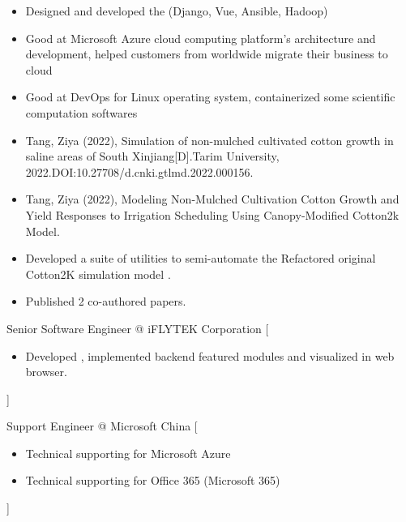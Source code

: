 \documentclass{resume}
\begin{document}
\begin{itemize}
  \item Designed and developed the  (Django, Vue, Ansible, Hadoop)
  \item Good at Microsoft Azure cloud computing platform's architecture and development, helped customers from worldwide migrate their business to cloud
  \item Good at DevOps for Linux operating system, containerized some scientific computation softwares
\end{itemize}

\begin{itemize}
  \item Tang, Ziya (2022), Simulation of non{-}mulched cultivated cotton growth in saline areas of South Xinjiang[D].Tarim University, 2022.DOI:10.27708/d.cnki.gtlmd.2022.000156.
  \item Tang, Ziya (2022), Modeling Non-Mulched Cultivation Cotton Growth and Yield Responses to Irrigation Scheduling Using Canopy-Modified Cotton2k Model.
\end{itemize}

\begin{itemize}
  \item Developed a suite of utilities to semi-automate the
    Refactored original Cotton2K simulation model
    .
  \item Published 2 co-authored papers.
\end{itemize}

\begin{experiences}
    {Senior Software Engineer @ iFLYTEK Corporation}%
    [\begin{itemize}
      \item Developed , implemented backend featured modules and visualized in web browser.
    \end{itemize}]

  \separator{0.5ex}
    {Support Engineer @ \icon{\faMicrosoft} Microsoft China}%
    [\begin{itemize}
      \item Technical supporting for Microsoft Azure
      \item Technical supporting for Office 365 (Microsoft 365)
    \end{itemize}]
\end{experiences}
\end{document}
